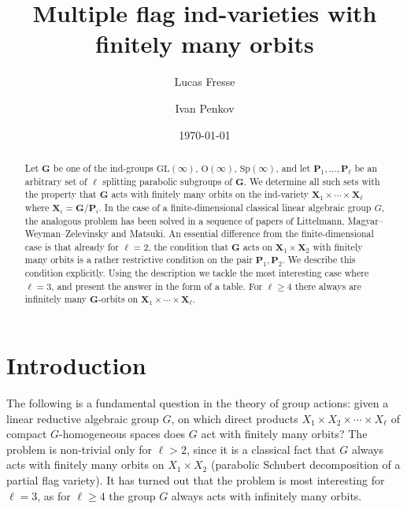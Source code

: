 \documentclass[12pt]{amsart}
\newcommand{\GL}{\mathrm{GL}}
\newcommand{\Sp}{\mathrm{Sp}}
\renewcommand{\O}{\mathrm{O}}
\newcommand{\G}{\mathbf{G}}
\renewcommand{\P}{\mathbf{P}}
\newcommand{\X}{\mathbf{X}}
\numberwithin{equation}{section}
\theoremstyle{definition}
\begin{document}
\title{Multiple flag ind-varieties with finitely many orbits}

\author{Lucas Fresse}
\address{Universit\'e de Lorraine, CNRS, Institut \'Elie Cartan de Lorraine, UMR 7502, Van\-doeuvre-l\`es-Nancy, F-54506 France}
\author{Ivan Penkov}
\address{Jacobs University Bremen, Campus Ring 1, 28759 Bremen, Germany}

\date{\today}

\begin{abstract}
Let $\G$ be one of the ind-groups $\GL(\infty)$, $\O(\infty)$, $\Sp(\infty)$, and let $\P_1,\ldots,\P_\ell$ be an arbitrary set of $\ell$ splitting parabolic subgroups of $\G$. We determine all such sets with the property that $\G$ acts with finitely many orbits on the ind-variety $\X_1\times\cdots\times\X_\ell$ where $\X_i=\G/\P_i$. In the case of a finite-dimensional classical linear algebraic group $G$, the analogous problem has been solved in a sequence of papers of Littelmann, Magyar--Weyman--Zelevinsky and Matsuki. An essential difference from the finite-dimensional case is that already for $\ell=2$, the condition that $\G$ acts on $\X_1\times \X_2$ with finitely many orbits is a rather restrictive condition on the pair $\P_1,\P_2$. We describe this condition explicitly. Using the description we tackle the most interesting case where $\ell=3$, and present the answer in the form of a table. For $\ell\geq 4$ there always are infinitely many $\G$-orbits on $\X_1\times\cdots\times\X_\ell$.
\end{abstract}


\maketitle

\section*{Introduction}

The following is a fundamental question in the theory of group actions: given a linear reductive algebraic group $G$, on which direct products $X_1\times X_2\times \cdots\times X_\ell$ of compact $G$-homogeneous spaces does $G$ act with finitely many orbits? The problem is non-trivial only for $\ell>2$, since it is a classical fact that $G$ always acts with finitely many orbits on $X_1\times X_2$ (parabolic Schubert decomposition of a partial flag variety). It has turned out that the problem is most interesting for $\ell=3$, as for $\ell\geq 4$ the group $G$ always acts with infinitely many orbits. 
\end{document}
